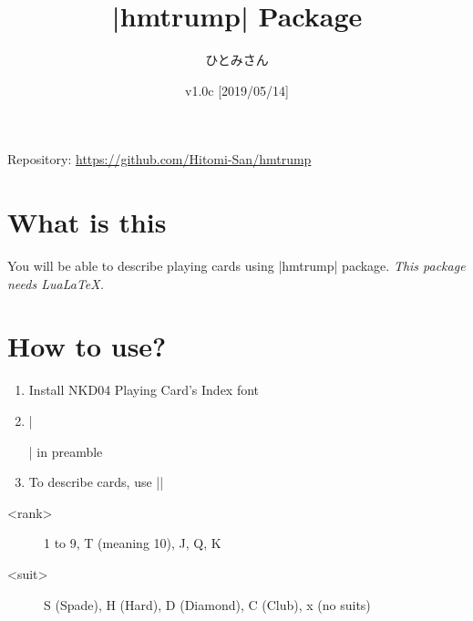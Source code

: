 \documentclass{jlreq}
\title{|hmtrump| Package}
\author{ひとみさん}
\date{v1.0c [2019/05/14]}
\begin{document}
\maketitle

\begin{center}
Repository: \url{https://github.com/Hitomi-San/hmtrump}
\end{center}

\hrulefill
\tableofcontents
\pagebreak

\section{What is this}
You will be able to describe playing cards using |hmtrump| package.
\emph{This package needs LuaLaTeX.}


\section{How to use?}
\begin{enumerate}
\item Install NKD04 Playing Card's Index font
\item |\usepackage{hmtrump}| in preamble
\item To describe cards, use ||
\end{enumerate}

\begin{description}
\item[<rank>] 1 to 9, T (meaning 10), J, Q, K
\item[<suit>] S (Spade), H (Hard), D (Diamond), C (Club), x (no suits)
\end{description}
\end{document}
